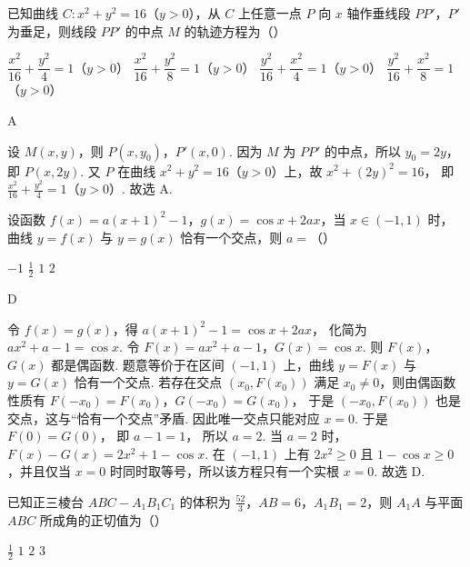\begin{problem}
已知曲线 \(C:x^2+y^2=16\)（\(y>0\)），从 \(C\) 上任意一点 \(P\) 向 \(x\) 轴作垂线段 \(PP'\)，\(P'\) 为垂足，则线段 \(PP'\) 的中点 \(M\) 的轨迹方程为（\quad）

\choices
    {\(\dfrac{x^2}{16}+\dfrac{y^2}{4}=1\)（\(y>0\)）}
    {\(\dfrac{x^2}{16}+\dfrac{y^2}{8}=1\)（\(y>0\)）}
    {\(\dfrac{y^2}{16}+\dfrac{x^2}{4}=1\)（\(y>0\)）}
    {\(\dfrac{y^2}{16}+\dfrac{x^2}{8}=1\)（\(y>0\)）}
\end{problem}

\begin{answer}
A
\end{answer}

\begin{solution}
设 \(M(x,y)\)，则 \(P(x,y_0)\)，\(P'(x,0)\).
因为 \(M\) 为 \(PP'\) 的中点，所以 \(y_0=2y\)，即 \(P(x,2y)\).
又 \(P\) 在曲线 \(x^2+y^2=16\)（\(y>0\)）上，故
\(x^2+(2y)^2=16\)，
即
\(\frac{x^2}{16}+\frac{y^2}{4}=1\)（\(y>0\)）.
故选 A.
\end{solution}

\begin{problem}
设函数 \(f(x)=a(x+1)^2-1\)，\(g(x)=\cos x+2ax\)，当 \(x\in(-1,1)\) 时，曲线 \(y=f(x)\) 与 \(y=g(x)\) 恰有一个交点，则 \(a=\)（\quad）

\choices
    {\(-1\)}
    {\(\frac12\)}
    {\(1\)}
    {\(2\)}
\end{problem}

\begin{answer}
D
\end{answer}

\begin{solution}
令 \(f(x)=g(x)\)，得
\(a(x+1)^2-1=\cos x+2ax\)，
化简为
\(ax^2+a-1=\cos x\).
令
\(F(x)=ax^2+a-1\)，\(G(x)=\cos x\).
则 \(F(x)\)，\(G(x)\) 都是偶函数. 题意等价于在区间 \((-1,1)\) 上，曲线 \(y=F(x)\) 与 \(y=G(x)\) 恰有一个交点.
若存在交点 \((x_0,F(x_0))\) 满足 \(x_0\ne 0\)，则由偶函数性质有
\(F(-x_0)=F(x_0)\)，\(G(-x_0)=G(x_0)\)，
于是 \((-x_0,F(x_0))\) 也是交点，这与“恰有一个交点”矛盾.
因此唯一交点只能对应 \(x=0\).
于是
\(F(0)=G(0)\)，
即
\(a-1=1\)，
所以 \(a=2\).
当 \(a=2\) 时，
\(F(x)-G(x)=2x^2+1-\cos x\).
在 \((-1,1)\) 上有 \(2x^2\ge 0\) 且 \(1-\cos x\ge 0\)，并且仅当 \(x=0\) 时同时取等号，所以该方程只有一个实根 \(x=0\).
故选 D.
\end{solution}

\begin{problem}
已知正三棱台 \(ABC-A_1B_1C_1\) 的体积为 \(\frac{52}{3}\)，\(AB=6\)，\(A_1B_1=2\)，则 \(A_1A\) 与平面 \(ABC\) 所成角的正切值为（\quad）

\choices
    {\(\frac12\)}
    {\(1\)}
    {\(2\)}
    {\(3\)}
\end{problem}

